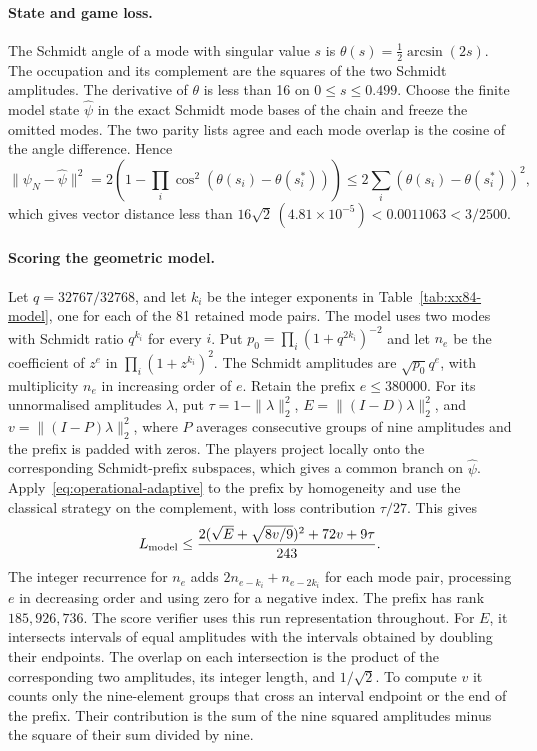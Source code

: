 \paragraph{State and game loss.}
The Schmidt angle of a mode with singular value $s$ is
$\theta(s)=\tfrac12\arcsin(2s)$. The occupation and its complement are
the squares of the two Schmidt amplitudes. The derivative of $\theta$
is less than 16 on $0\le s\le0.499$. Choose the finite model state
$\widehat\psi$ in the exact Schmidt mode bases of the chain and freeze
the omitted modes. The two parity lists agree and each mode overlap is
the cosine of the angle difference. Hence
\[
 \|\psi_N-\widehat\psi\|^2
 =2\left(1-\prod_i\cos^2(\theta(s_i)-\theta(s_i^*))\right)
 \le 2\sum_i(\theta(s_i)-\theta(s_i^*))^2,
\]
which gives vector distance less than
$16\sqrt2\,(4.81\times10^{-5})<0.0011063<3/2500$.

\paragraph{Scoring the geometric model.}
Let $q=32767/32768$, and let $k_i$ be the integer exponents in
Table~\ref{tab:xx84-model}, one for each of the 81 retained mode pairs.
The model uses two modes with Schmidt ratio $q^{k_i}$ for every $i$. Put
$p_0=\prod_i(1+q^{2k_i})^{-2}$ and let $n_e$ be the coefficient of $z^e$ in
$\prod_i(1+z^{k_i})^2$. The Schmidt amplitudes are $\sqrt{p_0}q^e$, with
multiplicity $n_e$ in increasing order of $e$. Retain the prefix $e\le380000$.
For its unnormalised amplitudes $\lambda$, put
$\tau=1-\|\lambda\|_2^2$, $E=\|(I-D)\lambda\|_2^2$, and
$v=\|(I-P)\lambda\|_2^2$, where $P$ averages consecutive groups of nine
amplitudes and the prefix is padded with zeros. The players project locally
onto the corresponding Schmidt-prefix subspaces, which gives a common
branch on $\widehat\psi$. Apply~\eqref{eq:operational-adaptive} to the
prefix by homogeneity and use the classical strategy on the complement,
with loss contribution $\tau/27$. This gives
\[
 L_{\rm model}\le
 \frac{2(\sqrt E+\sqrt{8v/9})^2+72v+9\tau}{243}.
\]
The integer recurrence for $n_e$ adds $2n_{e-k_i}+n_{e-2k_i}$ for each
mode pair, processing $e$ in decreasing order and using zero for a negative
index. The prefix has rank $185{,}926{,}736$. The score verifier uses this run
representation throughout. For $E$, it intersects intervals of equal
amplitudes with the intervals obtained by doubling their endpoints. The
overlap on each intersection is the product of the corresponding two
amplitudes, its integer length, and $1/\sqrt2$. To compute $v$ it counts
only the nine-element groups that cross an interval endpoint or the end of
the prefix. Their contribution is the sum of the nine squared amplitudes
minus the square of their sum divided by nine.


